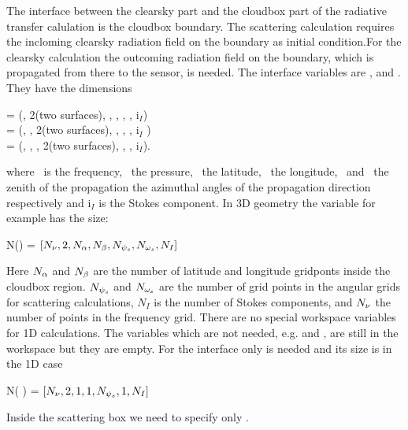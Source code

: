 \label{sec:scattering:interface}
The interface between the clearsky part and the cloudbox part of the radiative transfer calulation is the cloudbox boundary. The scattering calculation requires the incloming clearsky radiation field on the boundary as initial condition.For the clearsky calculation the outcoming radiation field on the boundary, which is propagated from there to the sensor, is needed.
The interface variables are  ,  and
. They have the dimensions 
\begin{center}
   =  (\Frq, 2(two surfaces), \Lat, \Lon, \ScaZa, \ScaAa, i$_I$)\\
  =  (\Frq, \Prs, 2(two surfaces), \Lon, \ScaZa,
\ScaAa, i$_I$ )\\
  =  (\Frq, \Prs, \Lat, 2(two surfaces), \ScaZa,
\ScaAa, i$_I$).
\end{center}
where \Frq\ is the frequency, \Prs\ the pressure, \Lat\ the latitude,
\Lon\ the longitude, \ScaZa\ and \ScaAa\  the zenith of the propagation
the azimuthal angles of the propagation direction respectively and
i$_I$ is the Stokes component. 
In 3D geometry the variable   for example has the
size:
\begin{center}
  N() = $[N_{\nu}, 2, N_{\alpha}, N_{\beta}, N_{{\psi_s}},
  N_{{\omega_s}}, N_I]$
\end{center} 

Here $N_{\alpha}$ and $N_{\beta}$ are the number of latitude and longitude gridponts inside the cloudbox region. $N_{{\psi_s}}$ and $N_{{\omega_s}}$ are the number of grid points in the angular grids for scattering calculations, $N_I$ is the number of Stokes components, and $N_{\nu}$ the number of points in the frequency grid. 
There are no special workspace variables for 1D calculations. The
variables which are not needed, e.g.  and
, are still in the workspace but they are
empty. For the interface only  is needed and its
size is in the 1D case
\begin{center}
N(  ) = $[N_{\nu}, 2, 1, 1,  N_{{\psi_s}}, 1,  N_I]$
\end{center}  
Inside the scattering box we need to specify only  
. 



